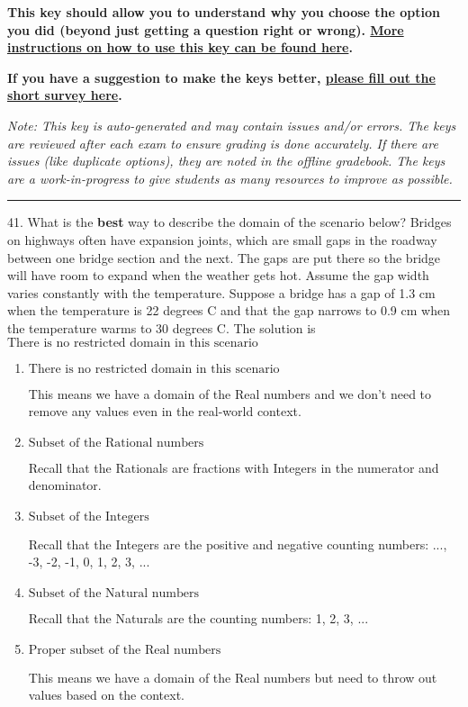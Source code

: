 \documentclass{extbook}[14pt]
\begin{document}
\textbf{This key should allow you to understand why you choose the option you did (beyond just getting a question right or wrong). \href{https://xronos.clas.ufl.edu/mac1105spring2020/courseDescriptionAndMisc/Exams/LearningFromResults}{More instructions on how to use this key can be found here}.}

\textbf{If you have a suggestion to make the keys better, \href{https://forms.gle/CZkbZmPbC9XALEE88}{please fill out the short survey here}.}

\textit{Note: This key is auto-generated and may contain issues and/or errors. The keys are reviewed after each exam to ensure grading is done accurately. If there are issues (like duplicate options), they are noted in the offline gradebook. The keys are a work-in-progress to give students as many resources to improve as possible.}

\rule{\textwidth}{0.4pt}

41. What is the \textbf{best} way to describe the domain of the scenario below?
Bridges on highways often have expansion joints, which are small gaps in the roadway between one bridge section and the next. The gaps are put there so the bridge will have room to expand when the weather gets hot. Assume the gap width varies constantly with the temperature. Suppose a bridge has a gap of 1.3 cm when the temperature is 22 degrees C and that the gap narrows to 0.9 cm when the temperature warms to 30 degrees C. 
The solution is $ \text{There is no restricted domain in this scenario} $ 

\begin{enumerate}[label=\Alph*.] 
\item $ \text{There is no restricted domain in this scenario} $ 

 This means we have a domain of the Real numbers and we don't need to remove any values even in the real-world context. 
\item $ \text{Subset of the Rational numbers} $ 

 Recall that the Rationals are fractions with Integers in the numerator and denominator. 
\item $ \text{Subset of the Integers} $ 

 Recall that the Integers are the positive and negative counting numbers: ..., -3, -2, -1, 0, 1, 2, 3, ...  
\item $ \text{Subset of the Natural numbers} $ 

 Recall that the Naturals are the counting numbers: 1, 2, 3, ... 
\item $ \text{Proper subset of the Real numbers} $ 

 This means we have a domain of the Real numbers but need to throw out values based on the context. 
\end{enumerate} 
 
\end{document}
